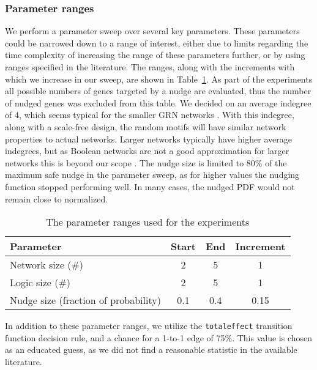 \documentclass[../main.tex]{subfiles}
\begin{document}
\subsubsection{Parameter ranges}

We perform a parameter sweep over several key parameters.
These parameters could be narrowed down to a range of interest, either due to limits regarding the time complexity of increasing the range of these parameters further, or by using ranges specified in the literature.
The ranges, along with the increments with which we increase in our sweep, are shown in Table~\ref{parameters}.
As part of the experiments all possible numbers of genes targeted by a nudge are evaluated, thus the number of nudged genes was excluded from this table.
We decided on an average indegree of 4, which seems typical for the smaller GRN networks \cite{lahdesmaki2003learning}.
With this indegree, along with a scale-free design, the random motifs will have similar network properties to actual networks.
Larger networks typically have higher average indegrees, but as Boolean networks are not a good approximation for larger networks this is beyond our scope \cite{karlebach2008modelling, lahdesmaki2003learning}.
The nudge size is limited to 80\% of the maximum safe nudge in the parameter sweep, as for higher values the nudging function stopped performing well.
In many cases, the nudged PDF would not remain close to normalized.

\begin{table}[H]
\begin{tabular}{| l | c | c | c |}
\hline
Parameter & Start & End & Increment \\
\hline
Network size (\#) & 2 & 5 & 1 \\
Logic size (\#) & 2 & 5 & 1 \\
Nudge size (fraction of probability) & 0.1 & 0.4 & 0.15 \\
\hline
\end{tabular}
\centering
\caption{The parameter ranges used for the experiments}
\label{parameters}
\end{table}

In addition to these parameter ranges, we utilize the \texttt{totaleffect} transition function decision rule, and a chance for a 1-to-1 edge of 75\%.
This value is chosen as an educated guess, as we did not find a reasonable statistic in the available literature.
\end{document}
